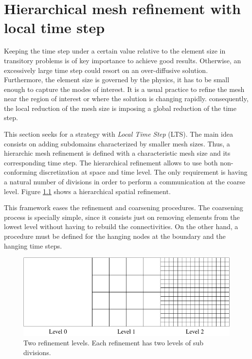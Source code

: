 
\chapter{Hierarchical mesh refinement with local time step}
\label{mesh_refinement}


Keeping the time step under a certain value relative to the element size in transitory problems is of key importance to achieve good results. Otherwise, an excessively large time step could resort on an over-diffusive solution.
Furthermore, the element size is governed by the physics, it has to be small enough to capture the modes of interest. It is a usual practice to refine the mesh near the region of interest or where the solution is changing rapidly. consequently, the local reduction of the mesh size is imposing a global reduction of the time step.

This section seeks for a strategy with \emph{Local Time Step} (LTS). The main idea consists on adding subdomains characterized by smaller mesh sizes. Thus, a hierarchic mesh refinement is defined with a characteristic mesh size and its corresponding time step. The hierarchical refinement allows to use both non-conforming discretization at space and time level. The only requirement is having a natural number of divisions in order to perform a communication at the coarse level. Figure \ref{multilevel_refinement} shows a hierarchical spatial refinement.

This framework eases the refinement and coarsening procedures. The coarsening process is specially simple, since it consists just on removing elements from the lowest level without having to rebuild the connectivities. On the other hand, a procedure must be defined for the hanging nodes at the boundary and the hanging time steps.



\begin{figure}
    \centering
    \includegraphics[width=.8\textwidth]{img/multigrid/multilevel_refinement.pdf}
    \caption{Two refinement levels. Each refinement has two levels of sub divisions.}
    \label{multilevel_refinement}
\end{figure}



